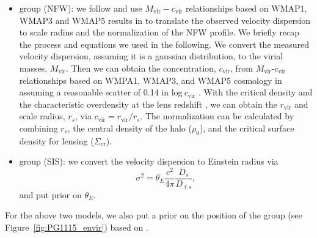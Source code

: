 \documentclass[useAMS,usenatbib]{mnras}
\newcommand\pg{PG\,1115$+$080}
\newcommand{\fref}[1]{Figure~\ref{#1}}
\begin{document}

\begin{itemize}
    \item group (NFW): we follow \citet{WongEtal11} and use $M_{\textrm{vir}}-c_{\textrm{vir}}$ relationships based on WMAP1, WMAP3 and WMAP5 results in \citet{MacciEtal08} to translate the observed velocity dispersion to scale radius and the normalization of the NFW profile. We briefly recap the process and equations we used in the following. We convert the measured velocity dispersion, assuming it is a gaussian distribution, to the virial masses, $M_{\textrm{vir}}$. Then we can obtain the concentration, $c_{\textrm{vir}}$, from $M_{\textrm{vir}}$-$c_{\textrm{vir}}$ relationships based on WMPA1, WMAP3, and WMAP5 cosmology in \citet{MacciEtal08} assuming a reasonable scatter of 0.14 in $\textrm{log} ~c_{\textrm{vir}}$ \citep{BullockEtal01,WongEtal11}. With the critical density and the characteristic overdensity at the lens redshift \citep{EkeEtal98,EkeEtal01}, we can obtain the $r_{\textrm{vir}}$ and scale radius, $r_{s}$, via $c_{\textrm{vir}}=r_{\textrm{vir}}/r_{s}$. The normalization can be calculated by combining $r_{s}$, the central density of the halo ($\rho_{0}$), and the critical surface density for lensing ($\Sigma_{\textrm{cr}}$).
    \item group (SIS): we convert the velocity dispersion to Einstein radius via
    \begin{equation}
    \label{eq:SISVDtoEr}
    \sigma^{2}=\theta_{E}\frac{c^{2}}{4\pi}\frac{D_{s}}{D_{\ell s}},
    \end{equation}
    and put prior on $\theta_{E}$.
\end{itemize}
For the above two models, we also put a prior on the position of the group (see \fref{fig:PG1115_envir}) based on \citet{WilsonEtal16}.
 
\end{document}
